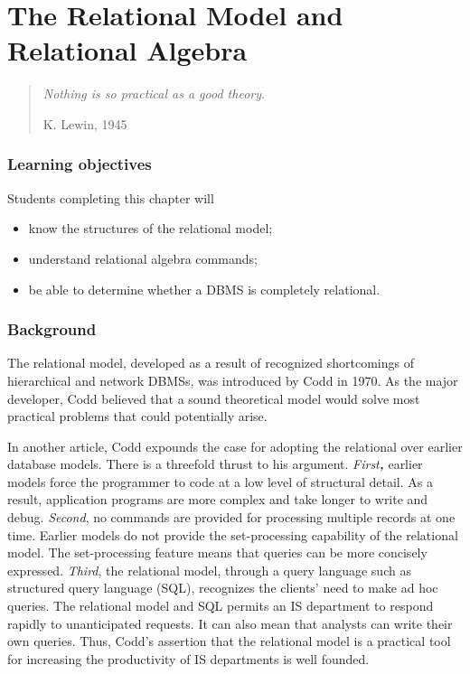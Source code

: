 \documentclass[
]{article}
\begin{document}
\hypertarget{the-relational-model-and-relational-algebra}{%
\section{The Relational Model and Relational Algebra}\label{the-relational-model-and-relational-algebra}}

\begin{quote}
\emph{Nothing is so practical as a good theory}.

K. Lewin, 1945
\end{quote}

\hypertarget{learning-objectives-8}{%
\subsubsection*{Learning objectives}\label{learning-objectives-8}}

Students completing this chapter will

\begin{itemize}
\item
  know the structures of the relational model;
\item
  understand relational algebra commands;
\item
  be able to determine whether a DBMS is completely relational.
\end{itemize}

\hypertarget{background}{%
\subsubsection*{Background}\label{background}}

The relational model, developed as a result of recognized shortcomings
of hierarchical and network DBMSs, was introduced by Codd in 1970. As
the major developer, Codd believed that a sound theoretical model would
solve most practical problems that could potentially arise.

In another article, Codd expounds the case for adopting the relational
over earlier database models. There is a threefold thrust to his
argument. \emph{First\textbf{,}} earlier models force the programmer to code at a
low level of structural detail. As a result, application programs are
more complex and take longer to write and debug. \emph{Second}, no commands
are provided for processing multiple records at one time. Earlier models
do not provide the set-processing capability of the relational model.
The set-processing feature means that queries can be more concisely
expressed. \emph{Third}, the relational model, through a query language such
as structured query language (SQL), recognizes the clients' need to make
ad hoc queries. The relational model and SQL permits an IS department to
respond rapidly to unanticipated requests. It can also mean that
analysts can write their own queries. Thus, Codd's assertion that the
relational model is a practical tool for increasing the productivity of
IS departments is well founded.
\end{document}
